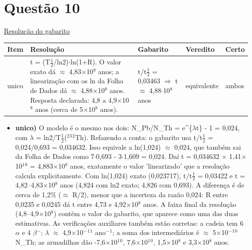 \documentclass{article}%
\begin{document}
\section*{Questão 10}%
\href{https://poliedroresolve.sistemapoliedro.com.br/vestibulares/ime/2027/ime-2-fase-dia-3-28-10-2026-2-fase-dia-3/dissertativa-10-quimica-2-fase-dia-3-ime-2027}{Resolução do gabarito}\par\smallskip%
\begin{longtable}{@{}p{} p{} p{} p{} p{}@{}}\toprule Item & Resolução & Gabarito & Veredito & Certo \\ \midrule
unico & t = (T$\frac12$/ln2)$\cdot$ln(1+R). O valor exato dá $\approx$ 4,83$\times$10$^{8}$ anos; a linearização com os ln da Folha de Dados dá $\approx$ 4,88$\times$10$^{8}$ anos. Resposta declarada: 4,8 a 4,9$\times$10$^{8}$ anos (cerca de 5$\times$10$^{8}$ anos). & t/t$\frac12$ = 0,03463 $\Rightarrow$ t $\approx$ 4,88$\cdot$10$^{8}$ anos & equivalente & ambos \\
\bottomrule\end{longtable}%
\begin{itemize}%
\item%
\textbf{unico)} O modelo é o mesmo nos dois: N\_Pb/N\_Th = e\^{}\{$\lambda$t\} - 1 = 0,024, com $\lambda$ = ln2/T$\frac12$($^2$$^3$$^2$Th). Refazendo a conta: o gabarito usa t/t$\frac12$ = 0,024/0,693 = 0,034632. Isso equivale a ln(1,024) $\approx$ 0,024, que também sai da Folha de Dados como 7$\cdot$0,693 - 3$\cdot$1,609 = 0,024. Daí t = 0,034632 $\times$ 1,41$\times$10$^{1}$$^{0}$ = 4,883$\times$10$^{8}$ anos, exatamente o valor 'linearizado' que a resolução calcula explicitamente. Com ln(1,024) exato (0,023717), t/t$\frac12$ = 0,03422 e t = 4,82--4,83$\times$10$^{8}$ anos (4,824 com ln2 exato; 4,826 com 0,693). A diferença é de cerca de 1,2\% ($\approx$ R/2), menor que a incerteza da razão 0,024: R entre 0,0235 e 0,0245 dá t entre 4,73 e 4,92$\times$10$^{8}$ anos. A faixa final da resolução (4,8--4,9$\times$10$^{8}$) contém o valor do gabarito, que aparece como uma das duas estimativas. As verificações auxiliares também estão corretas: a cadeia tem 6 $\alpha$ e 4 $\beta$$^{-}$; $\lambda$ $\approx$ 4,9$\times$10$^{-}$$^{1}$$^{1}$ ano$^{-}$$^{1}$; a soma dos intermediários é $\approx$ 5$\times$10$^{-}$$^{1}$$^{0}$ N\_Th; as armadilhas dão -7,6$\times$10$^{1}$$^{0}$, 7,6$\times$10$^{1}$$^{0}$, 1,5$\times$10$^{8}$ e 3,3$\times$10$^{8}$ anos.%
\end{itemize}%
\end{document}
